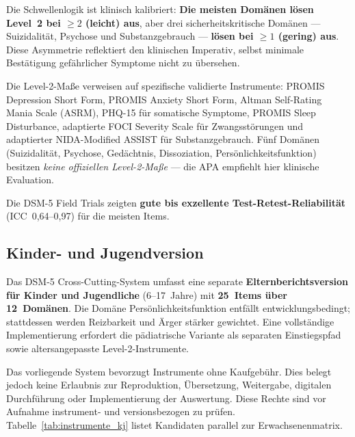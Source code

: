 \documentclass[11pt,a4paper]{article}
\begin{document}
Die Schwellenlogik ist klinisch kalibriert: \textbf{Die meisten Dom\"anen l\"osen Level~2 bei $\geq 2$ (leicht) aus}, aber drei sicherheitskritische Dom\"anen --- Suizidalit\"at, Psychose und Substanzgebrauch --- \textbf{l\"osen bei $\geq 1$ (gering) aus}. Diese Asymmetrie reflektiert den klinischen Imperativ, selbst minimale Best\"atigung gef\"ahrlicher Symptome nicht zu \"ubersehen.

Die Level-2-Ma\ss{}e verweisen auf spezifische validierte Instrumente: PROMIS Depression Short Form, PROMIS Anxiety Short Form, Altman Self-Rating Mania Scale (ASRM), PHQ-15 f\"ur somatische Symptome, PROMIS Sleep Disturbance, adaptierte FOCI Severity Scale f\"ur Zwangsst\"orungen und adaptierter NIDA-Modified ASSIST f\"ur Substanzgebrauch. F\"unf Dom\"anen (Suizidalit\"at, Psychose, Ged\"achtnis, Dissoziation, Pers\"onlichkeitsfunktion) besitzen \textit{keine offiziellen Level-2-Ma\ss{}e} --- die APA empfiehlt hier klinische Evaluation.

Die DSM-5 Field Trials \citep{Narrow2013} zeigten \textbf{gute bis exzellente Test-Retest-Reliabilit\"at} (ICC~0,64--0,97) f\"ur die meisten Items.

\subsection{Kinder- und Jugendversion}
\label{sec:screening_kj}

Das DSM-5 Cross-Cutting-System umfasst eine separate \textbf{Elternberichtsversion f\"ur Kinder und Jugendliche} (6--17~Jahre) mit \textbf{25~Items \"uber 12~Dom\"anen}. Die Dom\"ane \glqq Pers\"onlichkeitsfunktion\grqq{} entf\"allt entwicklungsbedingt; stattdessen werden Reizbarkeit und \"Arger st\"arker gewichtet. Eine vollst\"andige Implementierung erfordert die p\"adiatrische Variante als separaten Einstiegspfad sowie altersangepasste Level-2-Instrumente.

Das vorliegende System bevorzugt Instrumente ohne Kaufgeb\"uhr. Dies belegt jedoch keine Erlaubnis zur Reproduktion, \"Ubersetzung, Weitergabe, digitalen Durchf\"uhrung oder Implementierung der Auswertung. Diese Rechte sind vor Aufnahme instrument- und versionsbezogen zu pr\"ufen. Tabelle~\ref{tab:instrumente_kj} listet Kandidaten parallel zur Erwachsenenmatrix.
\end{document}
